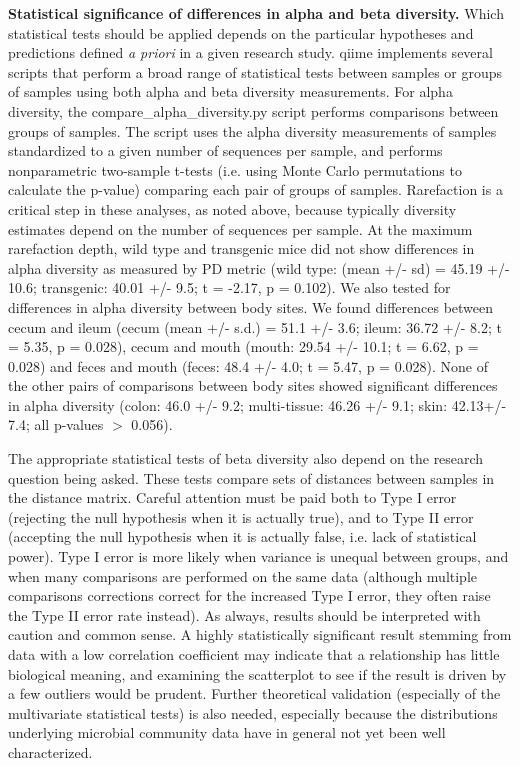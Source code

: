 \textbf{Statistical significance of differences in alpha and beta diversity.} Which
statistical tests should be applied depends on the particular hypotheses and predictions
defined \emph{a priori} in a given research study. \gls{qiime} implements several scripts
that perform a broad range of statistical tests between samples or groups of samples
using both alpha and beta diversity measurements. For alpha diversity, the
compare\_alpha\_diversity.py script performs comparisons between groups of samples.
The script uses the alpha diversity measurements of samples standardized to a given number
of sequences per sample, and performs nonparametric two-sample t-tests (i.e. using Monte Carlo
permutations to calculate the p-value) comparing each pair of groups of samples.
Rarefaction is a critical step in these analyses, as noted above, because typically diversity
estimates depend on the number of sequences per sample. At the maximum rarefaction depth,
wild type and transgenic mice did not show differences in alpha diversity as measured by PD
metric (wild type: (mean +/- sd) = 45.19 +/- 10.6; transgenic: 40.01 +/- 9.5; t = -2.17, p = 0.102).
We also tested for differences in alpha diversity between body sites. We found differences
between cecum and ileum (cecum (mean +/- s.d.) = 51.1 +/- 3.6; ileum: 36.72 +/- 8.2; t = 5.35, p = 0.028),
cecum and mouth (mouth: 29.54 +/- 10.1; t = 6.62, p = 0.028) and feces and
mouth (feces: 48.4 +/- 4.0; t = 5.47, p = 0.028). None of the other pairs of comparisons
between body sites showed significant differences in alpha diversity (colon: 46.0 +/- 9.2;
multi-tissue: 46.26 +/- 9.1; skin: 42.13+/- 7.4; all p-values $>$ 0.056).

The appropriate statistical tests of beta diversity also depend on the research question
being asked. These tests compare sets of distances between samples in the distance matrix.
Careful attention must be paid both to Type I error (rejecting the null hypothesis when it is actually
true), and to Type II error (accepting the null hypothesis when it is actually false, i.e. lack of
statistical power). Type I error is more likely when variance is unequal between groups, and when
many comparisons are performed on the same data (although multiple comparisons corrections correct
for the increased Type I error, they often raise the Type II error rate instead). As always,
results should be interpreted with caution and common sense. A highly statistically significant
result stemming from data with a low correlation coefficient may indicate that a relationship
has little biological meaning, and examining the scatterplot to see if the result is driven by a
few outliers would be prudent. Further theoretical validation (especially of the multivariate
statistical tests) is also needed, especially because the distributions underlying microbial
community data have in general not yet been well characterized.

